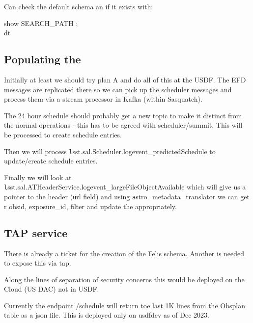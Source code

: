 Can check the default schema an if  it exists with:
\begin{code}
show SEARCH\_PATH ;
\\dt
\end{code}


\subsection{Populating the \DB}

Initially at least we should try plan A and do all of this at the USDF.
The EFD messages are replicated there so we can pick up the scheduler messages and process them via a stream processor in Kafka (within Sasquatch).

The 24 hour schedule should probably get a new topic to make it distinct from the normal operations - this has to be agreed with scheduler/summit. This will be processed to create schedule entries.

Then we will process {\texttt lsst.sal.Scheduler.logevent\_predictedSchedule } to update/create schedule entries.

Finally we will look at {\texttt lsst.sal.ATHeaderService.logevent\_largeFileObjectAvailable} which will give us a pointer to the header ({\texttt url} field) and using {\texttt astro\_metadata\_translator}  we can get r obsid, exposure\_id, filter and update the \DB appropriately.

\subsection{TAP service}

There is already a ticket  for the creation of the Felis schema.
Another is needed to expose this via tap.

Along the lines of separation of security concerns this would be deployed on the Cloud (US DAC) not in USDF.

Currently the endpoint /schedule will return toe last 1K lines from the Obsplan table as a json file.
This is deployed only on usdfdev as of Dec 2023.
